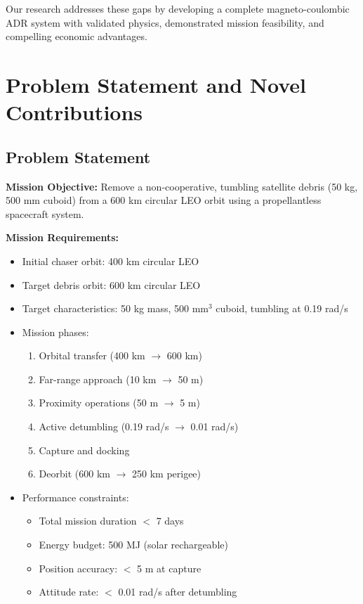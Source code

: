 \documentclass[12pt,a4paper]{article}
\begin{document}
Our research addresses these gaps by developing a complete magneto-coulombic ADR system with validated physics, demonstrated mission feasibility, and compelling economic advantages.

\section{Problem Statement and Novel Contributions}

\subsection{Problem Statement}

\textbf{Mission Objective:} Remove a non-cooperative, tumbling satellite debris (50 kg, 500 mm cuboid) from a 600 km circular LEO orbit using a propellantless spacecraft system.

\textbf{Mission Requirements:}
\begin{itemize}
\item Initial chaser orbit: 400 km circular LEO
\item Target debris orbit: 600 km circular LEO
\item Target characteristics: 50 kg mass, 500 mm$^3$ cuboid, tumbling at 0.19 rad/s
\item Mission phases:
  \begin{enumerate}
  \item Orbital transfer (400 km $\rightarrow$ 600 km)
  \item Far-range approach (10 km $\rightarrow$ 50 m)
  \item Proximity operations (50 m $\rightarrow$ 5 m)
  \item Active detumbling (0.19 rad/s $\rightarrow$ 0.01 rad/s)
  \item Capture and docking
  \item Deorbit (600 km $\rightarrow$ 250 km perigee)
  \end{enumerate}
\item Performance constraints:
  \begin{itemize}
  \item Total mission duration $<$ 7 days
  \item Energy budget: 500 MJ (solar rechargeable)
  \item Position accuracy: $<$ 5 m at capture
  \item Attitude rate: $<$ 0.01 rad/s after detumbling
  \end{itemize}
\end{itemize}
\end{document}
